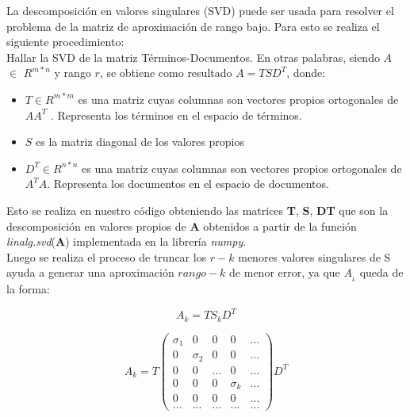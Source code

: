 \documentclass[spanish]{article}
\begin{document}
La descomposición en valores singulares (SVD) puede ser usada para resolver el problema de la matriz de aproximación de rango bajo. Para esto se realiza el siguiente procedimiento:\\

 Hallar la SVD de la matriz Términos-Documentos. En otras palabras, siendo ${\displaystyle A}$ $ \in $ ${\displaystyle R^{m*n}}$ y rango ${\displaystyle r}$, se obtiene como resultado ${\displaystyle A=TSD^{T}}$, donde:
\begin{itemize}

\item ${\displaystyle T} \in {\displaystyle R^{m*m}}$ es una matriz cuyas columnas son vectores propios ortogonales de $ {\displaystyle AA^{T}}$ . Representa los términos en el espacio de términos.

\item ${\displaystyle S}$ es la matriz diagonal de los valores propios

\item ${\displaystyle D^T} \in {\displaystyle R^{n*n}}$ es una matriz cuyas columnas son vectores propios ortogonales de ${\displaystyle A^{T}A}$. Representa los documentos en el espacio de documentos.
\end{itemize}

Esto se realiza en nuestro código obteniendo las matrices \textbf{T}, \textbf{S}, \textbf{DT} que son la descomposición en valores propios de \textbf{A} obtenidos a partir de la función \emph{linalg.svd}(\textbf{A})
implementada en la librería \emph{numpy}.\\

Luego se realiza el proceso de truncar los $r-k$ menores valores
 singulares de S ayuda a generar una aproximación $rango-k$ de menor error, ya que $A_{_{k}}$ queda de la forma:

$$A_{k}=TS_{k}D^{T}$$

\begin{equation}
A_{k}= T
\begin{pmatrix}
\sigma_{1} & 0 & 0 & 0 & ...\\
0 & \sigma_{2} & 0 & 0 & ...\\
0 & 0 & ... & 0 & ...\\
0 & 0 & 0 & \sigma_{k} & ... \\
0 & 0 & 0 & 0 & ...\\
... & ... & ... & ... & ...
\end{pmatrix}
D^{T}
\end{equation}
\end{document}
